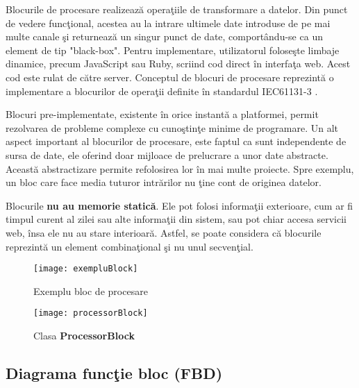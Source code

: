 Blocurile de procesare realizează operaţiile de transformare a datelor. Din punct de vedere funcţional, acestea au la intrare ultimele date introduse de pe mai multe canale şi returnează un singur punct de date, comportându-se ca un element de tip "black-box"\autocite{functionBlocks}. Pentru implementare, utilizatorul foloseşte limbaje dinamice, precum JavaScript sau Ruby, scriind cod direct în interfaţa web. Acest cod este rulat de către server. 
Conceptul de blocuri de procesare reprezintă o implementare a blocurilor de operaţii definite în standardul  IEC61131-3 \autocite[Apendix C]{IEC61131-3} .

Blocuri pre-implementate, existente în orice instantă a platformei, permit rezolvarea de probleme complexe cu cunoştinţe minime de programare.
Un alt aspect important al blocurilor de procesare, este faptul ca sunt independente de sursa de date, ele oferind doar mijloace de prelucrare a unor date abstracte. Această abstractizare permite refolosirea lor în mai multe proiecte. Spre exemplu, un bloc care face media tuturor intrărilor nu ţine cont de originea datelor. 

Blocurile \textbf{nu au memorie statică}. Ele pot folosi informaţii exterioare, cum ar fi timpul curent al zilei sau alte informaţii din sistem, sau pot chiar accesa servicii web, însa ele nu au stare interioară. Astfel, se poate considera că blocurile reprezintă un element combinaţional şi nu unul secvenţial.
\begin{figure}[H]
	\centering
	\texttt{[image: exempluBlock]}
	\caption{Exemplu bloc de procesare}
\end{figure}

\begin{figure}[H]
	\centering
	\texttt{[image: processorBlock]}
	\caption{Clasa \textbf{ProcessorBlock}}
\end{figure}

\subsection{Diagrama funcţie bloc (FBD)}

